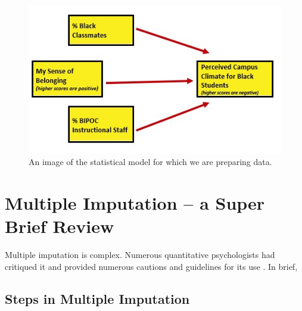 \documentclass[
  11pt,
]{book}
\begin{document}
\begin{figure}
\centering
\includegraphics{images/Ch04/BlStuRegression.jpg}
\caption{An image of the statistical model for which we are preparing data.}
\end{figure}

\hypertarget{multiple-imputation-a-super-brief-review}{%
\section{Multiple Imputation -- a Super Brief Review}\label{multiple-imputation-a-super-brief-review}}

Multiple imputation is complex. Numerous quantitative psychologists had critiqued it and provided numerous cautions and guidelines for its use \citep{enders_applied_2010, enders_multiple_2017, little_missing_2008, little_statistical_2002}. In brief,

\hypertarget{steps-in-multiple-imputation}{%
\subsection{Steps in Multiple Imputation}\label{steps-in-multiple-imputation}}
\end{document}
